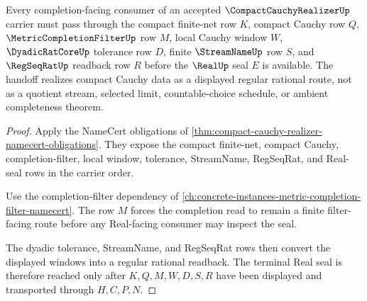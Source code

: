 \begin{theorem}
\label{thm:compact-cauchy-realizer-completion-handoff}
Every completion-facing consumer of an accepted $\CompactCauchyRealizerUp$ carrier must pass through the compact finite-net row $K$, compact Cauchy row $Q$, $\MetricCompletionFilterUp$ row $M$, local Cauchy window $W$, $\DyadicRatCoreUp$ tolerance row $D$, finite $\StreamNameUp$ row $S$, and $\RegSeqRatUp$ readback row $R$ before the $\RealUp$ seal $E$ is available. The handoff realizes compact Cauchy data as a displayed regular rational route, not as a quotient stream, selected limit, countable-choice schedule, or ambient completeness theorem.
\end{theorem}
\begin{proof}
Apply the NameCert obligations of \autoref{thm:compact-cauchy-realizer-namecert-obligations}. They expose the compact finite-net, compact Cauchy, completion-filter, local window, tolerance, StreamName, RegSeqRat, and Real-seal rows in the carrier order.

Use the completion-filter dependency of \autoref{ch:concrete-instances-metric-completion-filter-namecert}. The row $M$ forces the completion read to remain a finite filter-facing route before any Real-facing consumer may inspect the seal.

The dyadic tolerance, StreamName, and RegSeqRat rows then convert the displayed windows into a regular rational readback. The terminal Real seal is therefore reached only after $K,Q,M,W,D,S,R$ have been displayed and transported through $H,C,P,N$.
\end{proof}

